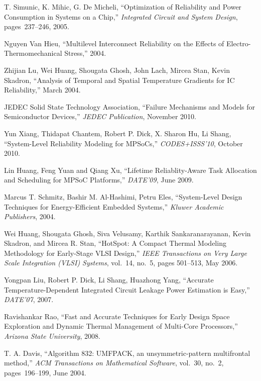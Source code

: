 \begin{thebibliography}{99}
    T. Simunic, K. Mihic, G. De Micheli,
    ``Optimization of Reliability and Power Consumption in Systems on a Chip,''
    \emph{Integrated Circuit and System Design},
    pages~237--246, 2005.

    Nguyen Van Hieu,
    ``Multilevel Interconnect Reliability on the Effects of Electro-Thermomechanical Stress,''
    2004.

    Zhijian Lu, Wei Huang, Shougata Ghosh, John Lach, Mircea Stan, Kevin Skadron,
    ``Analysis of Temporal and Spatial Temperature Gradients for IC Reliability,''
    March 2004.

    JEDEC Solid State Technology Association,
    ``Failure Mechanisms and Models for Semiconductor Devices,''
    \emph{JEDEC Publication},
    November 2010.

    Yun Xiang, Thidapat Chantem, Robert P. Dick, X. Sharon Hu, Li Shang,
    ``System-Level Reliability Modeling for MPSoCs,''
    \emph{CODES+ISSS'10},
    October 2010.

    Lin Huang, Feng Yuan and Qiang Xu,
    ``Lifetime Reliablity-Aware Task Allocation and Scheduling for MPSoC Platforms,''
    \emph{DATE'09},
    June 2009.

    Marcus T. Schmitz, Bashir M. Al-Hashimi, Petru Eles,
    ``System-Level Design Techniques for Energy-Efficient Embedded Systems,''
    \emph{Kluwer Academic Publishers},
    2004.

    Wei Huang, Shougata Ghosh, Siva Velusamy, Karthik Sankaranarayanan, Kevin Skadron, and Mircea R. Stan,
    ``HotSpot: A Compact Thermal Modeling Methodology for Early-Stage VLSI Design,''
    \emph{IEEE Transactions on Very Large Scale Integration (VLSI) Systems},
    vol.~14, no.~5, pages 501--513, May 2006.

    Yongpan Liu, Robert P. Dick, Li Shang, Huazhong Yang,
    ``Accurate Temperature-Dependent Integrated Circuit Leakage Power Estimation is Easy,''
    \emph{DATE'07},
    2007.

    Ravishankar Rao,
    ``Fast and Accurate Techniques for Early Design Space Exploration and Dynamic Thermal Management of Multi-Core Processors,''
    \emph{Arizona State University},
    2008.

    T. A. Davis,
    ``Algorithm 832: UMFPACK, an unsymmetric-pattern multifrontal method,''
    \emph{ACM Transactions on Mathematical Software},
    vol.~30, no.~2, pages~196--199, June 2004.


\end{thebibliography}
